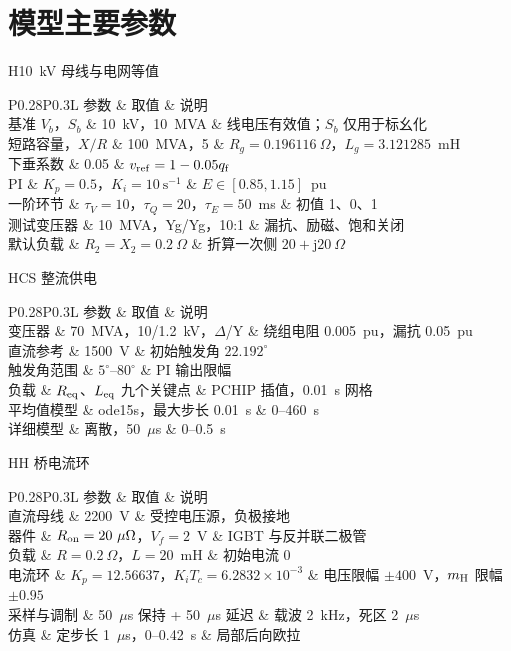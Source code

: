 
\chapter{模型主要参数}
\label{app:params}

\newcommand{\paramtable}[2]{%
\begin{dtable}{H}{#1}
\begin{tabularx}{\linewidth}{P{0.28\linewidth}P{0.3\linewidth}L}
\toprule
\headrow 参数 & 取值 & 说明 \\
\midrule
#2
\bottomrule
\end{tabularx}
\end{dtable}}

\paramtable{10~kV 母线与电网等值}{%
基准 $V_b$，$S_b$ & 10~kV，10~MVA & 线电压有效值；$S_b$ 仅用于标幺化 \\
短路容量，$X/R$ & 100~MVA，5 & $R_g=0.196116\ \Omega$，$L_g=3.121285$~mH \\
下垂系数 & 0.05 & $v_{\mathrm{ref}}=1-0.05q_{\mathrm{f}}$ \\
PI & $K_p=0.5$，$K_i=10\ \mathrm{s^{-1}}$ & $E\in[0.85,1.15]$~pu \\
一阶环节 & $\tau_V=10$，$\tau_Q=20$，$\tau_E=50$~ms & 初值 1、0、1 \\
测试变压器 & 10~MVA，Yg/Yg，10:1 & 漏抗、励磁、饱和关闭 \\
默认负载 & $R_2=X_2=0.2\ \Omega$ & 折算一次侧 $20+\mathrm{j}20\ \Omega$ \\
}

\paramtable{CS 整流供电}{%
变压器 & 70~MVA，10/1.2~kV，$\Delta$/Y & 绕组电阻 0.005~pu，漏抗 0.05~pu \\
直流参考 & 1500~V & 初始触发角 $22.192^\circ$ \\
触发角范围 & $5^\circ$--$80^\circ$ & PI 输出限幅 \\
负载 & $R_{\mathrm{eq}}$、$L_{\mathrm{eq}}$ 九个关键点 & PCHIP 插值，0.01~s 网格 \\
平均值模型 & ode15s，最大步长 0.01~s & 0--460~s \\
详细模型 & 离散，50~$\mu$s & 0--0.5~s \\
}

\paramtable{H 桥电流环}{%
直流母线 & 2200~V & 受控电压源，负极接地 \\
器件 & $R\sub{on}=20\ \mu\Omega$，$V_f=2$~V & IGBT 与反并联二极管 \\
负载 & $R=0.2\ \Omega$，$L=20$~mH & 初始电流 0 \\
电流环 & $K_p=12.56637$，$K_iT_c=6.2832\times10^{-3}$ & 电压限幅 $\pm400$~V，$m_{\mathrm{H}}$ 限幅 $\pm0.95$ \\
采样与调制 & 50~$\mu$s 保持 + 50~$\mu$s 延迟 & 载波 2~kHz，死区 2~$\mu$s \\
仿真 & 定步长 1~$\mu$s，0--0.42~s & 局部后向欧拉 \\
}

